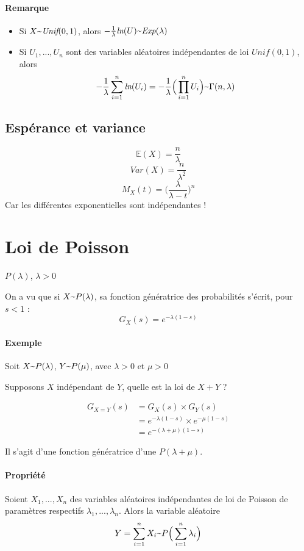 \documentclass{article}
\newcommand{\textapprox}{\raisebox{0.5ex}{\texttildelow}}
\begin{document}
\paragraph{Remarque}
\begin{itemize}
  \item Si $X \textapprox \textit{Unif}(0,1)$, alors $- \frac{1}{\lambda} \textit{ln}(U) \textapprox \textit{Exp}(\lambda)$
  \item Si $U_1,...,U_n$ sont des variables aléatoires indépendantes de loi $\textit{Unif}(0,1)$, alors $$ - \frac{1}{\lambda} \sum_{i=1}^n \textit{ln}(U_i) = - \frac{1}{\lambda} \Big( \prod_{i=1}^n U_i \Big) \textapprox \Gamma(n, \lambda) $$
\end{itemize}

\subsection{Espérance et variance}
$$ \mathbb{E}(X) = \frac{n}{\lambda} $$
$$ \textit{Var}(X) = \frac{n}{\lambda^2} $$
$$ M_X(t) = \Big( \frac{\lambda}{\lambda - t} \Big)^n $$
Car les différentes exponentielles sont indépendantes !

\section{Loi de Poisson}
$P(\lambda)$, $\lambda > 0$

On a vu que si $X \textapprox P(\lambda)$, sa fonction génératrice des probabilités s'écrit, pour $s < 1$ :
$$ G_X(s) = e^{- \lambda (1 - s)} $$

\paragraph{Exemple}
Soit $X \textapprox P(\lambda)$, $Y \textapprox P(\mu)$, avec $\lambda > 0$ et $\mu > 0$

Supposons $X$ indépendant de $Y$, quelle est la loi de $X + Y$ ?

\begin{align*}
  G_{X=Y}(s) &= G_X(s) \times G_Y(s) \\
  &= e^{-\lambda (1-s)} \times e^{-\mu (1-s)} \\
  &= e^{-( \lambda + \mu)(1-s)}
\end{align*}

Il s'agit d'une fonction génératrice d'une $P(\lambda + \mu)$.

\paragraph{Propriété } Soient $X_1,...,X_n$ des variables aléatoires indépendantes
de loi de Poisson de paramètres respectifs $\lambda_1,...,\lambda_n$.
Alors la variable aléatoire $$ Y = \sum_{i=1}^n X_i \textapprox P\Big( \sum_{i=1}^n \lambda_i \Big) $$
\end{document}
